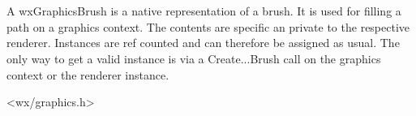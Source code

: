 
\section{}\label{wxgraphicsbrush}



A wxGraphicsBrush is a native representation of a brush. It is used for filling a path on a graphics context. The contents are specific an private to the respective renderer. Instances are ref counted and can therefore be assigned as usual. The only way to get a valid instance is via a Create...Brush call on the graphics context or the renderer instance.


<wx/graphics.h>


